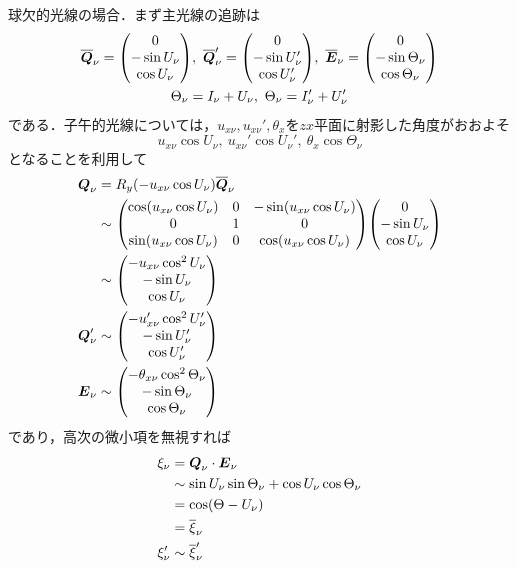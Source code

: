 \documentclass{jsarticle}
\begin{document}
球欠的光線の場合．まず主光線の追跡は
\begin{gather}
    \overline{\vb*{Q}}_\nu=\mqty(0\\ -\sin U_\nu\\ \cos U_\nu),\ 
    \overline{\vb*{Q}}_\nu'=\mqty(0\\ -\sin U_\nu'\\ \cos U_\nu'),\ 
    \overline{\vb*{E}}_\nu=\mqty(0\\ -\sin \Theta_\nu\\ \cos \Theta_\nu)\\
    \Theta_\nu=I_\nu+U_\nu,\ \Theta_\nu=I_\nu'+U_\nu'
\end{gather}
である．子午的光線については，$u_{x\nu}, u_{x\nu}', \theta_x$を$zx$平面に射影した角度がおおよそ
\begin{equation}
    u_{x\nu}\cos U_\nu,\ u_{x\nu}'\cos U_\nu',\ \theta_x\cos\Theta_\nu
\end{equation}
となることを利用して
\begin{align}
    &\begin{aligned}
        \vb*{Q}_\nu&=R_y(-u_{x\nu}\cos U_\nu)\overline{\vb*{Q}}_\nu\\
        &\sim
        \mqty(
            \cos (u_{x\nu}\cos U_\nu) & 0 & -\sin (u_{x\nu}\cos U_\nu)\\
            0 & 1 & 0\\
            \sin (u_{x\nu}\cos U_\nu) & 0 & \cos (u_{x\nu}\cos U_\nu)
        )
        \mqty(
            0\\
            -\sin U_\nu\\
            \cos U_\nu
        )\\
        &\sim \mqty(
            -u_{x\nu}\cos^2 U_\nu\\
            -\sin U_\nu\\
            \cos U_\nu
        )\\
    \end{aligned}\\
    &\vb*{Q}_\nu'\sim
    \mqty(
        -u_{x\nu}'\cos^2 U_\nu'\\
        -\sin U_\nu'\\
        \cos U_\nu'
    )\\
    &\vb*{E}_\nu\sim
    \mqty(
        -\theta_{x\nu}\cos^2 \Theta_\nu\\
        -\sin \Theta_\nu\\
        \cos \Theta_\nu
    )
\end{align}
であり，高次の微小項を無視すれば
\begin{align}
    &\begin{aligned}
        \xi_\nu
        &=\vb*{Q}_\nu\cdot\vb*{E}_\nu\\
        &\sim \sin U_\nu\sin \Theta_\nu + \cos U_\nu \cos \Theta_\nu\\
        &=\cos(\Theta-U_\nu)\\
        &=\overline{\xi}_\nu
    \end{aligned}\\
    & \xi_\nu'\sim \overline{\xi}_\nu'
\end{align}
\end{document}
